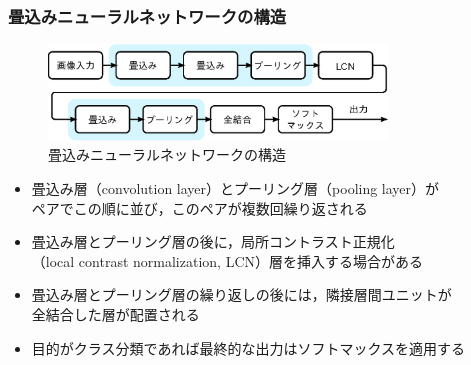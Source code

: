 \documentclass[dvipdfmx,11pt,notheorems]{beamer}
\theoremstyle{definition}
\begin{document}
\begin{frame}[fragile]\frametitle{畳込みニューラルネットワークの構造}

\begin{figure}[tb]
  \begin{center}
    \includegraphics[clip,width=9cm]{fig/eps/structure.eps}
  \end{center}
  \caption{畳込みニューラルネットワークの構造}
\end{figure}

\begin{itemize}
\item 畳込み層（convolution layer）とプーリング層（pooling layer）が\\ペアでこの順に並び，このペアが複数回繰り返される
\item 畳込み層とプーリング層の後に，局所コントラスト正規化\\（local contrast normalization, LCN）層を挿入する場合がある
\item 畳込み層とプーリング層の繰り返しの後には，隣接層間ユニットが\\全結合した層が配置される
\item 目的がクラス分類であれば最終的な出力はソフトマックスを適用する
\end{itemize}
\end{frame}
\end{document}
